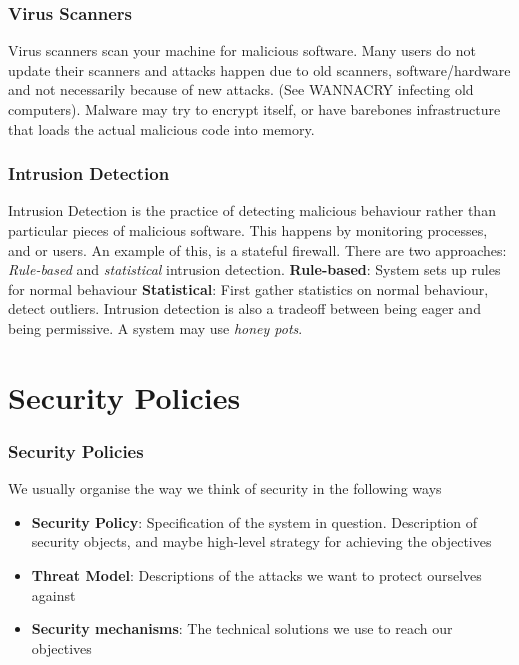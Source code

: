     \begin{frame}
        \frametitle{Virus Scanners}
            Virus scanners scan your machine for malicious software. Many users do not update their scanners and attacks happen due to old scanners, software/hardware and not necessarily because of new attacks. (See WANNACRY infecting old computers). 
            Malware may try to encrypt itself, or have barebones infrastructure that loads the actual malicious code into memory.
    \end{frame}

    \begin{frame}
        \frametitle{Intrusion Detection}
            Intrusion Detection is the practice of detecting malicious behaviour rather than particular pieces of malicious software. This happens by monitoring processes, and or users. 
            An example of this, is a stateful firewall. There are two approaches: \textit{Rule-based} and \textit{statistical} intrusion detection. 
            \textbf{Rule-based}: System sets up rules for normal behaviour
            \textbf{Statistical}: First gather statistics on normal behaviour, detect outliers. 
            Intrusion detection is also a tradeoff between being eager and being permissive. 
            A system may use \textit{honey pots}. 
    \end{frame}

\section{Security Policies}
    \begin{frame}
        \frametitle{Security Policies}
            We usually organise the way we think of security in the following ways
            \begin{itemize}
                \item \textbf{Security Policy}: Specification of the system in question. Description of security objects, and maybe high-level strategy for achieving the objectives 
                \item \textbf{Threat Model}: Descriptions of the attacks we want to protect ourselves against
                \item \textbf{Security mechanisms}: The technical solutions we use to reach our objectives
            \end{itemize}
    \end{frame}

